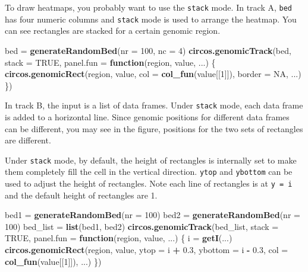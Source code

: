 \documentclass[]{book}
\newenvironment{Shaded}{\begin{snugshade}}{\end{snugshade}}
\newcommand{\KeywordTok}[1]{\textcolor[rgb]{0.13,0.29,0.53}{\textbf{#1}}}
\newcommand{\DataTypeTok}[1]{\textcolor[rgb]{0.13,0.29,0.53}{#1}}
\newcommand{\DecValTok}[1]{\textcolor[rgb]{0.00,0.00,0.81}{#1}}
\newcommand{\FloatTok}[1]{\textcolor[rgb]{0.00,0.00,0.81}{#1}}
\newcommand{\StringTok}[1]{\textcolor[rgb]{0.31,0.60,0.02}{#1}}
\newcommand{\OtherTok}[1]{\textcolor[rgb]{0.56,0.35,0.01}{#1}}
\newcommand{\ControlFlowTok}[1]{\textcolor[rgb]{0.13,0.29,0.53}{\textbf{#1}}}
\newcommand{\OperatorTok}[1]{\textcolor[rgb]{0.81,0.36,0.00}{\textbf{#1}}}
\newcommand{\NormalTok}[1]{#1}
\begin{document}
To draw heatmaps, you probably want to use the \texttt{stack} mode. In
track A, \texttt{bed} has four numeric columns and \texttt{stack} mode
is used to arrange the heatmap. You can see rectangles are stacked for a
certain genomic region.

\begin{Shaded}
\begin{Highlighting}[]
\NormalTok{bed =}\StringTok{ }\KeywordTok{generateRandomBed}\NormalTok{(}\DataTypeTok{nr =} \DecValTok{100}\NormalTok{, }\DataTypeTok{nc =} \DecValTok{4}\NormalTok{)}
\KeywordTok{circos.genomicTrack}\NormalTok{(bed, }\DataTypeTok{stack =} \OtherTok{TRUE}\NormalTok{, }
    \DataTypeTok{panel.fun =} \ControlFlowTok{function}\NormalTok{(region, value, ...) \{}
        \KeywordTok{circos.genomicRect}\NormalTok{(region, value, }\DataTypeTok{col =} \KeywordTok{col_fun}\NormalTok{(value[[}\DecValTok{1}\NormalTok{]]), }\DataTypeTok{border =} \OtherTok{NA}\NormalTok{, ...)}
\NormalTok{\})}
\end{Highlighting}
\end{Shaded}

In track B, the input is a list of data frames. Under \texttt{stack}
mode, each data frame is added to a horizontal line. Since genomic
positions for different data frames can be different, you may see in the
figure, positions for the two sets of rectangles are different.

Under \texttt{stack} mode, by default, the height of rectangles is
internally set to make them completely fill the cell in the vertical
direction. \texttt{ytop} and \texttt{ybottom} can be used to adjust the
height of rectangles. Note each line of rectangles is at
\texttt{y\ =\ i} and the default height of rectangles are 1.

\begin{Shaded}
\begin{Highlighting}[]
\NormalTok{bed1 =}\StringTok{ }\KeywordTok{generateRandomBed}\NormalTok{(}\DataTypeTok{nr =} \DecValTok{100}\NormalTok{)}
\NormalTok{bed2 =}\StringTok{ }\KeywordTok{generateRandomBed}\NormalTok{(}\DataTypeTok{nr =} \DecValTok{100}\NormalTok{)}
\NormalTok{bed_list =}\StringTok{ }\KeywordTok{list}\NormalTok{(bed1, bed2)}
\KeywordTok{circos.genomicTrack}\NormalTok{(bed_list, }\DataTypeTok{stack =} \OtherTok{TRUE}\NormalTok{, }
    \DataTypeTok{panel.fun =} \ControlFlowTok{function}\NormalTok{(region, value, ...) \{}
\NormalTok{        i =}\StringTok{ }\KeywordTok{getI}\NormalTok{(...)}
        \KeywordTok{circos.genomicRect}\NormalTok{(region, value, }\DataTypeTok{ytop =}\NormalTok{ i }\OperatorTok{+}\StringTok{ }\FloatTok{0.3}\NormalTok{, }\DataTypeTok{ybottom =}\NormalTok{ i }\OperatorTok{-}\StringTok{ }\FloatTok{0.3}\NormalTok{,}
            \DataTypeTok{col =} \KeywordTok{col_fun}\NormalTok{(value[[}\DecValTok{1}\NormalTok{]]), ...)}
\NormalTok{\})}
\end{Highlighting}
\end{Shaded}
\end{document}
